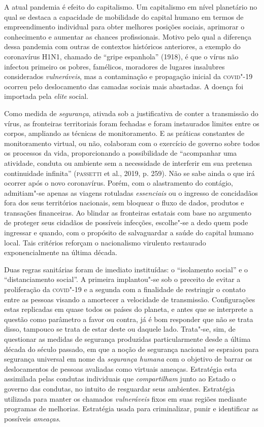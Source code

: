 A atual pandemia é efeito do capitalismo. Um capitalismo em nível
planetário no qual se destaca a capacidade de mobilidade do capital
humano em termos de empreendimento
individual para obter melhores
posições sociais, aprimorar o conhecimento e aumentar as chances
profissionais. Motivo pelo qual a diferença dessa pandemia com outras de
contextos históricos anteriores, a exemplo do coronavírus H1N1, chamado
de ``gripe espanhola'' (1918), é que o vírus não infectou primeiro os
pobres, famélicos, moradores de lugares insalubres considerados
\emph{vulneráveis}, mas a contaminação e propagação inicial da \textsc{covid}"-19
ocorreu pelo deslocamento das camadas sociais mais abastadas. A doença
foi importada pela \emph{elite} social.

Como medida de \emph{segurança}, ativada sob a justificativa de conter a
transmissão do vírus, as fronteiras territoriais foram fechadas e foram
instaurados limites entre os corpos, ampliando as técnicas de
monitoramento. E as práticas constantes de monitoramento virtual, ou
não, colaboram com o exercício de governo sobre todos os processos da
vida, proporcionando a possibilidade de ``acompanhar uma atividade,
conduta ou ambiente sem a necessidade de interferir em sua pretensa
continuidade infinita'' (\textsc{passetti} et al., 2019, p. 259). Não se sabe
ainda o que irá ocorrer após o novo coronavírus. Porém, com o
alastramento do contágio, admitiam"-se apenas as viagens rotuladas
\emph{essenciais} ou o ingresso de concidadãos fora dos seus territórios
nacionais, sem bloquear o fluxo de dados, produtos e transações
financeiras. Ao blindar as fronteiras estatais com base no argumento de
proteger seus cidadãos de possíveis infecções, escolhe"-se a dedo quem
pode ingressar e quando, com o propósito de salvaguardar a saúde do
capital humano local. Tais critérios reforçam o nacionalismo virulento
restaurado exponencialmente na última década.

Duas regras sanitárias foram de imediato instituídas: o ``isolamento
social'' e o ``distanciamento social''. A primeira implantou"-se sob o
preceito de evitar a proliferação da \textsc{covid}"-19 e a segunda com a
finalidade de restringir o contato entre as pessoas visando a amortecer
a velocidade de transmissão. Configurações estas replicadas em quase
todos os países do planeta, e antes que se interprete a questão como
parâmetro a favor ou contra, já é bom responder que não se trata disso,
tampouco se trata de estar deste ou daquele lado. Trata"-se, sim, de
questionar as medidas de segurança produzidas particularmente desde a
última década do século passado, em que a noção de segurança nacional se
espraiou para segurança universal em nome da \emph{segurança humana} com
o objetivo de barrar os deslocamentos de pessoas avaliadas como virtuais
ameaças. Estratégia esta assimilada pelas condutas individuais que
\emph{compartilham} junto ao Estado o governo das condutas, no intuito
de resguardar seus ambientes. Estratégia utilizada para manter os
chamados \emph{vulneráveis} fixos em suas regiões mediante programas de
melhorias. Estratégia usada para criminalizar, punir e identificar as
possíveis \emph{ameaças}.

